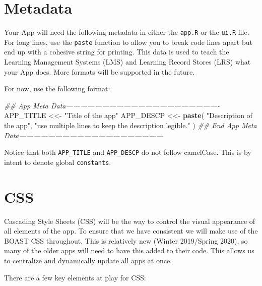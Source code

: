 \documentclass[
]{book}
\newenvironment{Shaded}{\begin{snugshade}}{\end{snugshade}}
\newcommand{\CommentTok}[1]{\textcolor[rgb]{0.56,0.35,0.01}{\textit{#1}}}
\newcommand{\KeywordTok}[1]{\textcolor[rgb]{0.13,0.29,0.53}{\textbf{#1}}}
\newcommand{\NormalTok}[1]{#1}
\newcommand{\StringTok}[1]{\textcolor[rgb]{0.31,0.60,0.02}{#1}}
\begin{document}
\hypertarget{metadata}{%
\section{Metadata}\label{metadata}}

Your App will need the following metadata in either the \texttt{app.R} or the \texttt{ui.R} file. For long lines, use the \texttt{paste} function to allow you to break code lines apart but end up with a cohesive string for printing. This data is used to teach the Learning Management Systems (LMS) and Learning Record Stores (LRS) what your App does. More formats will be supported in the future.

For now, use the following format:

\begin{Shaded}
\begin{Highlighting}[]
\CommentTok{## App Meta Data----------------------------------------------------------------}
\NormalTok{APP_TITLE  <<-}\StringTok{ "Title of the app"}
\NormalTok{APP_DESCP  <<-}\StringTok{ }\KeywordTok{paste}\NormalTok{(}
  \StringTok{"Description of the app"}\NormalTok{,}
  \StringTok{"use multiple lines to keep the description legible."}
\NormalTok{)}
\CommentTok{## End App Meta Data------------------------------------------------------------}
\end{Highlighting}
\end{Shaded}

Notice that both \texttt{APP\_TITLE} and \texttt{APP\_DESCP} do not follow camelCase. This is by intent to denote global \texttt{constants}.

\hypertarget{css}{%
\section{CSS}\label{css}}

Cascading Style Sheets (CSS) will be the way to control the visual appearance of all elements of the app. To ensure that we have consistent we will make use of the BOAST CSS throughout. This is relatively new (Winter 2019/Spring 2020), so many of the older apps will need to have this added to their code. This allows us to centralize and dynamically update all apps at once.

There are a few key elements at play for CSS:
\end{document}

